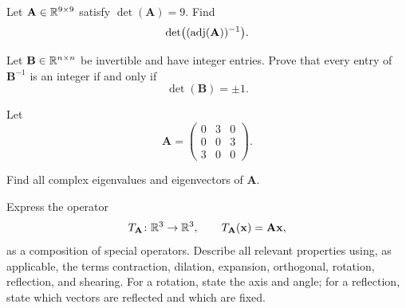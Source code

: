 \documentclass[11pt,oneside]{article}
\begin{document}
\begin{problem}
\begin{problemsubparts}
\item Let $\mathbf A\in\mathbb{R}^{9\times9}$ satisfy $\det(\mathbf A)=9$. Find
\[
\det\bigl((\operatorname{adj}(\mathbf A))^{-1}\bigr).
\]
\item Let $\mathbf B\in\mathbb{R}^{n\times n}$ be invertible and have integer entries. Prove that every entry of $\mathbf B^{-1}$ is an integer if and only if
\[
\det(\mathbf B)=\pm1.
\]
\end{problemsubparts}
\end{problem}

\begin{problem}
Let
\[
\mathbf A=
\begin{pmatrix}
0&3&0\\
0&0&3\\
3&0&0
\end{pmatrix}.
\]
\begin{problemsubparts}
\item Find all complex eigenvalues and eigenvectors of $\mathbf A$.
\item Express the operator
\[
T_{\mathbf A}\colon\mathbb{R}^3\to\mathbb{R}^3,
\qquad
T_{\mathbf A}(\mathbf x)=\mathbf A\mathbf x,
\]
as a composition of special operators. Describe all relevant properties using, as applicable, the terms contraction, dilation, expansion, orthogonal, rotation, reflection, and shearing. For a rotation, state the axis and angle; for a reflection, state which vectors are reflected and which are fixed.
\end{problemsubparts}
\end{problem}
\end{document}
